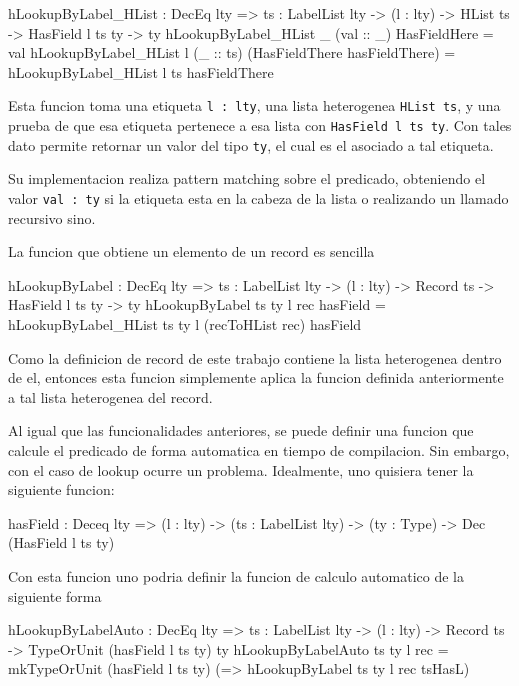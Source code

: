 \begin{code}
hLookupByLabel_HList : DecEq lty => {ts : LabelList lty} -> 
  (l : lty) -> HList ts -> HasField l ts ty -> ty
hLookupByLabel_HList _ (val :: _) HasFieldHere = val
hLookupByLabel_HList l (_ :: ts) 
  (HasFieldThere hasFieldThere) = 
  hLookupByLabel_HList l ts hasFieldThere
\end{code}

Esta funcion toma una etiqueta \texttt{l : lty}, una lista heterogenea \texttt{HList ts}, y una prueba de que esa etiqueta pertenece a esa lista con \texttt{HasField l ts ty}. Con tales dato permite retornar un valor del tipo \texttt{ty}, el cual es el asociado a tal etiqueta.

Su implementacion realiza pattern matching sobre el predicado, obteniendo el valor \texttt{val : ty} si la etiqueta esta en la cabeza de la lista o realizando un llamado recursivo sino.

La funcion que obtiene un elemento de un record es sencilla

\begin{code}
hLookupByLabel : DecEq lty => {ts : LabelList lty} -> 
  (l : lty) -> Record ts -> HasField l ts ty -> ty
hLookupByLabel {ts} {ty} l rec hasField = 
  hLookupByLabel_HList {ts} {ty} l (recToHList rec) hasField
\end{code}

Como la definicion de record de este trabajo contiene la lista heterogenea dentro de el, entonces esta funcion simplemente aplica la funcion definida anteriormente a tal lista heterogenea del record.

Al igual que las funcionalidades anteriores, se puede definir una funcion que calcule el predicado de forma automatica en tiempo de compilacion. Sin embargo, con el caso de lookup ocurre un problema. Idealmente, uno quisiera tener la siguiente funcion:

\begin{code}
hasField : Deceq lty => (l : lty) -> 
  (ts : LabelList lty) -> (ty : Type) -> 
  Dec (HasField l ts ty)
\end{code}

Con esta funcion uno podria definir la funcion de calculo automatico de la siguiente forma

\begin{code}
hLookupByLabelAuto : DecEq lty => {ts : LabelList lty} ->
  (l : lty) -> Record ts -> 
  TypeOrUnit (hasField l ts ty) ty
hLookupByLabelAuto {ts} {ty} l rec = 
  mkTypeOrUnit (hasField l ts ty) 
  (\tsHasL => hLookupByLabel {ts} {ty} l rec tsHasL)
\end{code}

